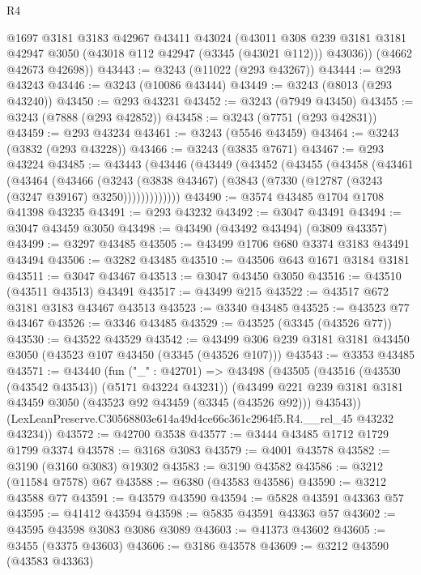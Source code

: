 \begin{lexlean}{R4}
\begin{coremodule}
        @1697
        @3181
        @3183
        @42967
        @43411
        @43024
        (@43011
          @308
          @239
          @3181
          @3181
          @42947
          @3050
          (@43018 @112 @42947 (@3345 (@43021 @112)))
          @43036))
      (@4662 @42673 @42698))
@43443 := @3243 (@11022 (@293 @43267))
@43444 := @293 @43243
@43446 := @3243 (@10086 @43444)
@43449 := @3243 (@8013 (@293 @43240))
@43450 := @293 @43231
@43452 := @3243 (@7949 @43450)
@43455 := @3243 (@7888 (@293 @42852))
@43458 := @3243 (@7751 (@293 @42831))
@43459 := @293 @43234
@43461 := @3243 (@5546 @43459)
@43464 := @3243 (@3832 (@293 @43228))
@43466 := @3243 (@3835 @7671)
@43467 := @293 @43224
@43485 := @43443
    (@43446
      (@43449
        (@43452
          (@43455
            (@43458
              (@43461
                (@43464
                  (@43466
                    (@3243
                      (@3838 @43467)
                      (@3843 (@7330 (@12787 (@3243 (@3247 @39167) @3250)))))))))))))
@43490 := @3574 @43485 @1704 @1708 @41398 @43235
@43491 := @293 @43232
@43492 := @3047 @43491
@43494 := @3047 @43459 @3050
@43498 := @43490 (@43492 @43494) (@3809 @43357)
@43499 := @3297 @43485
@43505 := @43499 @1706 @680 @3374 @3183 @43491 @43494
@43506 := @3282 @43485
@43510 := @43506 @643 @1671 @3184 @3181
@43511 := @3047 @43467
@43513 := @3047 @43450 @3050
@43516 := @43510 (@43511 @43513) @43491
@43517 := @43499 @215
@43522 := @43517 @672 @3181 @3183 @43467 @43513
@43523 := @3340 @43485
@43525 := @43523 @77 @43467
@43526 := @3346 @43485
@43529 := @43525 (@3345 (@43526 @77))
@43530 := @43522 @43529
@43542 := @43499 @306 @239 @3181 @3181 @43450 @3050 (@43523 @107 @43450 (@3345 (@43526 @107)))
@43543 := @3353 @43485
@43571 := @43440
    (fun ("_" : @42701) =>
    @43498
      (@43505
        (@43516 (@43530 (@43542 @43543)) (@5171 @43224 @43231))
        (@43499 @221 @239 @3181 @3181 @43459 @3050 (@43523 @92 @43459 (@3345 (@43526 @92))) @43543))
      (LexLeanPreserve.C30568803e614a49d4ce66c361c2964f5.R4.__rel_45 @43232 @43234))
@43572 := @42700 @3538
@43577 := @3444 @43485 @1712 @1729 @1799 @3374
@43578 := @3168 @3083
@43579 := @4001 @43578
@43582 := @3190 (@3160 @3083) @19302
@43583 := @3190 @43582
@43586 := @3212 (@11584 @7578) @67
@43588 := @6380 (@43583 @43586)
@43590 := @3212 @43588 @77
@43591 := @43579 @43590
@43594 := @5828 @43591 @43363 @57
@43595 := @41412 @43594
@43598 := @5835 @43591 @43363 @57
@43602 := @43595 @43598 @3083 @3086 @3089
@43603 := @41373 @43602
@43605 := @3455 (@3375 @43603)
@43606 := @3186 @43578
@43609 := @3212 @43590 (@43583 @43363)

\end{coremodule}
\end{lexlean}
